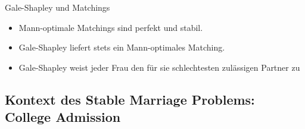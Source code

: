 \documentclass{panikzettel}
\begin{document}
\begin{theo}{Gale-Shapley und Matchings}
	\begin{itemize}
		\item Mann-optimale Matchings sind perfekt und stabil.
		\item Gale-Shapley liefert stets ein Mann-optimales Matching.
		\item Gale-Shapley weist jeder Frau den für sie schlechtesten zulässigen Partner zu
	\end{itemize}

\end{theo}

\subsection{Kontext des Stable Marriage Problems: College Admission}
\end{document}
